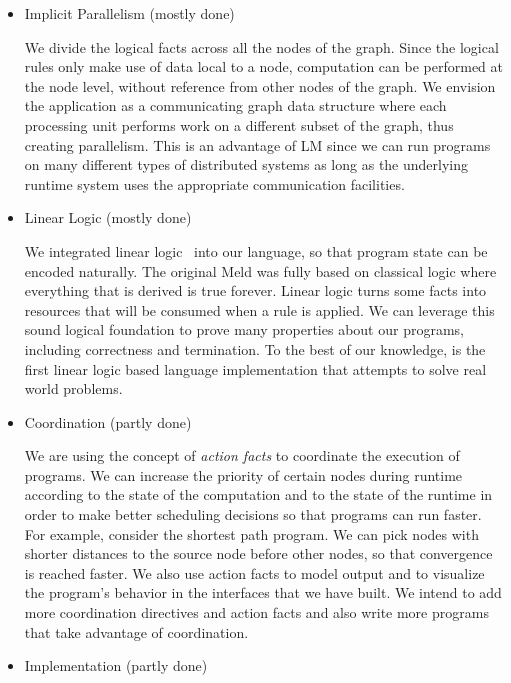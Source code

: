 \begin{itemize}
   \item Implicit Parallelism (mostly done)
   
   We divide the logical facts across all the nodes of the graph. Since the
   logical rules only make use of data local to a node, computation can be performed at the
   node level, without reference from other nodes of the graph. We envision the application as
   a communicating graph data structure where each processing unit performs work on a different subset of the graph,
   thus creating parallelism. This is an advantage of LM since we can run programs on many different types
   of distributed systems as long as the underlying runtime system uses the appropriate communication facilities.
   
   \item Linear Logic (mostly done)

   We integrated linear logic~\cite{Girard95logic:its} into our language, so that program state
   can be encoded naturally. The original Meld was fully based on classical logic where everything that
   is derived is true forever. Linear logic turns some facts into resources that will be consumed when a rule is applied. We can leverage this sound logical foundation to prove many properties about our programs, including correctness and termination. To the best of our knowledge, \lang is the first
   linear logic based language implementation that attempts to solve real world problems.

   \item Coordination (partly done)
   
   We are using the concept of \emph{action facts} to coordinate the execution of programs.
   We can increase the priority of certain nodes during runtime according to the state of the
   computation and to the state of the runtime in order to make better scheduling decisions
   so that programs can run faster.
   For example, consider the shortest path program. We can pick nodes with shorter
   distances to the source node before other nodes, so that convergence is reached faster.
   We also use action facts to model output and to visualize the program's behavior in the
   interfaces that we have built. We intend to add more coordination directives and action facts
   and also write more programs that take advantage of coordination.

   \item Implementation (partly done)


\end{itemize}
